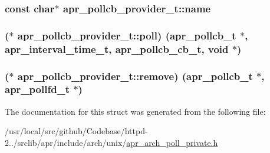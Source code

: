 \subsubsection[{\texorpdfstring{name}{name}}]{\setlength{\rightskip}{0pt plus 5cm}const char$\ast$ apr\+\_\+pollcb\+\_\+provider\+\_\+t\+::name}\hypertarget{structapr__pollcb__provider__t_ac4303695db9501a328d7dd52dae4d2d5}{}\label{structapr__pollcb__provider__t_ac4303695db9501a328d7dd52dae4d2d5}
\subsubsection[{\texorpdfstring{poll}{poll}}]{($\ast$ apr\+\_\+pollcb\+\_\+provider\+\_\+t\+::poll) ({\bf apr\+\_\+pollcb\+\_\+t} $\ast$, {\bf apr\+\_\+interval\+\_\+time\+\_\+t}, {\bf apr\+\_\+pollcb\+\_\+cb\+\_\+t}, {\bf void} $\ast$)}\hypertarget{structapr__pollcb__provider__t_a7229a072271b269b3dd5fca868df01e3}{}\label{structapr__pollcb__provider__t_a7229a072271b269b3dd5fca868df01e3}
\subsubsection[{\texorpdfstring{remove}{remove}}]{($\ast$ apr\+\_\+pollcb\+\_\+provider\+\_\+t\+::remove) ({\bf apr\+\_\+pollcb\+\_\+t} $\ast$, {\bf apr\+\_\+pollfd\+\_\+t} $\ast$)}\hypertarget{structapr__pollcb__provider__t_a587ac036405acca0125e4cb32571683d}{}\label{structapr__pollcb__provider__t_a587ac036405acca0125e4cb32571683d}


The documentation for this struct was generated from the following file\+:\begin{DoxyCompactItemize}
\item 
/usr/local/src/github/\+Codebase/httpd-\/2../srclib/apr/include/arch/unix/\hyperlink{apr__arch__poll__private_8h}{apr\+\_\+arch\+\_\+poll\+\_\+private.\+h}\end{DoxyCompactItemize}
